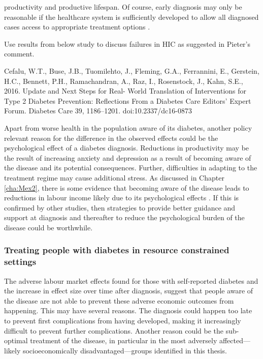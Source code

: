 productivity and productive lifespan. Of course, early diagnosis may only be reasonable if the healthcare system is sufficiently developed to allow all diagnosed cases access to appropriate treatment options \parencite{Toscano2015,Engelgau2012}. 

Use results from below study to discuss failures in HIC as suggested in Pieter's comment.

Cefalu, W.T., Buse, J.B., Tuomilehto, J., Fleming, G.A., Ferrannini, E., Gerstein, H.C., Bennett, P.H., Ramachandran, A., Raz, I., Rosenstock, J., Kahn, S.E., 2016. Update and Next Steps for Real- World Translation of Interventions for Type 2 Diabetes Prevention: Reflections From a Diabetes Care Editors’ Expert Forum. Diabetes Care 39, 1186–1201. doi:10.2337/dc16-0873  

Apart from worse health in the population aware of its diabetes, another policy relevant reason for the difference in the observed effects could be the psychological effect of a diabetes diagnosis. Reductions in productivity may be the result of increasing anxiety and depression as a result of becoming aware of the disease and its potential consequences. Further, difficulties in adapting to the treatment regime may cause additional stress. As discussed in Chapter \ref{cha:Mex2}, there is some evidence that becoming aware of the disease leads to reductions in labour income likely due to its psychological effects \parencite{Liu2014}. If this is confirmed by other studies, then strategies to provide better guidance and support at diagnosis and thereafter to reduce the psychological burden of the disease could be worthwhile.



\subsubsection{Treating people with diabetes in resource constrained settings}

The adverse labour market effects found for those with self-reported diabetes and the increase in effect size over time after diagnosis, suggest that people aware of the disease are not able to prevent these adverse economic outcomes from happening. This may have several reasons. The diagnosis could happen too late to prevent first complications from having developed, making it increasingly difficult to prevent further complications. Another reason could be the sub-optimal treatment of the disease, in particular in the most adversely affected---likely socioeconomically disadvantaged---groups identified in this thesis.

